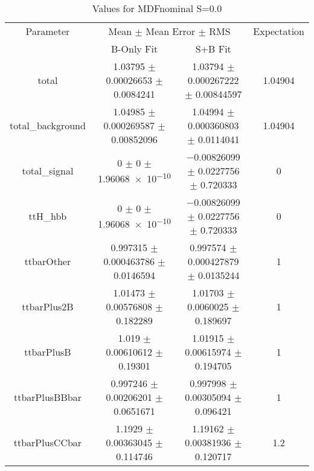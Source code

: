 \begin{table}
\centering
\caption{Values for MDFnominal S=0.0}
\begin{tabular}{cccc}
\toprule
Parameter & \multicolumn{2}{c}{Mean $\pm$ Mean Error $\pm$ RMS} & Expectation\\
 & B-Only Fit & S+B Fit & \\
\midrule
total & \num{1.03795} $\pm$ \num{0.00026653} $\pm$ \num{0.0084241} & \num{1.03794} $\pm$ \num{0.000267222} $\pm$ \num{0.00844597} & \num{1.04904}\\
total\_background & \num{1.04985} $\pm$ \num{0.000269587} $\pm$ \num{0.00852096} & \num{1.04994} $\pm$ \num{0.000360803} $\pm$ \num{0.0114041} & \num{1.04904}\\
total\_signal & \num{0} $\pm$ \num{0} $\pm$ \num{1.96068e-10} & \num{-0.00826099} $\pm$ \num{0.0227756} $\pm$ \num{0.720333} & \num{0}\\
ttH\_hbb & \num{0} $\pm$ \num{0} $\pm$ \num{1.96068e-10} & \num{-0.00826099} $\pm$ \num{0.0227756} $\pm$ \num{0.720333} & \num{0}\\
ttbarOther & \num{0.997315} $\pm$ \num{0.000463786} $\pm$ \num{0.0146594} & \num{0.997574} $\pm$ \num{0.000427879} $\pm$ \num{0.0135244} & \num{1}\\
ttbarPlus2B & \num{1.01473} $\pm$ \num{0.00576808} $\pm$ \num{0.182289} & \num{1.01703} $\pm$ \num{0.0060025} $\pm$ \num{0.189697} & \num{1}\\
ttbarPlusB & \num{1.019} $\pm$ \num{0.00610612} $\pm$ \num{0.19301} & \num{1.01915} $\pm$ \num{0.00615974} $\pm$ \num{0.194705} & \num{1}\\
ttbarPlusBBbar & \num{0.997246} $\pm$ \num{0.00206201} $\pm$ \num{0.0651671} & \num{0.997998} $\pm$ \num{0.00305094} $\pm$ \num{0.096421} & \num{1}\\
ttbarPlusCCbar & \num{1.1929} $\pm$ \num{0.00363045} $\pm$ \num{0.114746} & \num{1.19162} $\pm$ \num{0.00381936} $\pm$ \num{0.120717} & \num{1.2}\\
\bottomrule
\end{tabular}
\end{table}